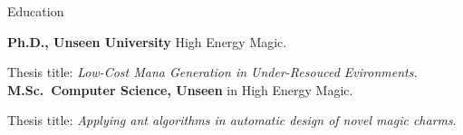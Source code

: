 \begin{rubric}{Education}

\entry*[2009 -- 2013]%
	\textbf{Ph.D., Unseen University} High Energy Magic.
	\par Thesis title: \emph{Low-Cost Mana Generation in Under-Resouced Evironments.}
%
\entry*[2003 -- 2006]%
	\textbf{M.Sc.~Computer Science, Unseen} in High Energy Magic.\par
	Thesis title: \emph{Applying ant algorithms in automatic design of novel magic charms}.
\end{rubric}